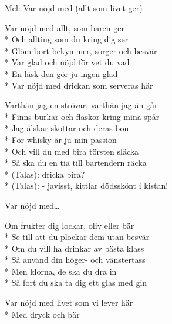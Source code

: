 \begin{SongText}
    \begin{SongInfo}
        Mel: Var nöjd med (allt som livet ger)
    \end{SongInfo}
    \begin{SongVerse}
        Var nöjd med allt, som baren ger\\*%
        Och allting som du kring dig ser\\*%
        Glöm bort bekymmer, sorger och besvär\\*%
        Var glad och nöjd för vet du vad\\*%
        En läsk den gör ju ingen glad\\*%
        Var nöjd med drickan som serveras här
    \end{SongVerse}
    \begin{SongVerse}
        Varthän jag en strövar, varthän jag än går\\*%
        Finns burkar och flaskor kring mina spår\\*%
        Jag älskar skottar och deras bon\\*%
        För whisky är ju min passion\\*%
        Och vill du med bira törsten släcka\\*%
        Så ska du en tia till bartendern räcka\\*%
        (Talas): dricka bira?\\*%
        (Talas): - javisst, kittlar dödsskönt i kistan!
    \end{SongVerse}
    \begin{SongVerse}
        Var nöjd med…
    \end{SongVerse}
    \begin{SongVerse}
        Om frukter dig lockar, oliv eller bär\\*%
        Se till att du plockar dem utan besvär\\*%
        Om du vill ha drinkar av bästa klass\\*%
        Så använd din höger- och vänstertass\\*%
        Men klorna, de ska du dra in\\*%
        Så fort du ska ta dig ett glas med gin
    \end{SongVerse}
    \begin{SongVerse}
        Var nöjd med livet som vi lever här\\*%
        Med dryck och bär 
    \end{SongVerse}
\end{SongText}
